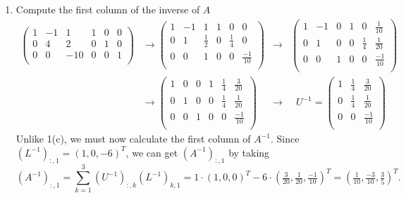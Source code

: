 \documentclass[11pt]{article}
\begin{document}
\begin{enumerate}
\begin{enumerate}
		      \item Compute the first column of the inverse of \(A\)
		            \begin{align*}
			            \left(\begin{array}{rrr|rrr}
					                  1 & -1 & 1   & 1 & 0 & 0 \\
					                  0 & 4  & 2   & 0 & 1 & 0 \\
					                  0 & 0  & -10 & 0 & 0 & 1 \\
				                  \end{array}\right)
			             & \to
			            \left(\begin{array}{rrr|rrr}
					                  1 & -1 & 1       & 1 & 0       & 0             \\
					                  0 & 1  & \frac12 & 0 & \frac14 & 0             \\
					                  0 & 0  & 1       & 0 & 0       & \frac{-1}{10} \\
				                  \end{array}\right)
			             & \to &
			            \left(\begin{array}{rrr|rrr}
					                  1 & -1 & 0 & 1 & 0       & \frac{1}{10}  \\
					                  0 & 1  & 0 & 0 & \frac14 & \frac{1}{20}  \\
					                  0 & 0  & 1 & 0 & 0       & \frac{-1}{10} \\
				                  \end{array}\right) \\
			             & \to
			            \left(\begin{array}{rrr|rrr}
					                  1 & 0 & 0 & 1 & \frac14 & \frac{3}{20}  \\
					                  0 & 1 & 0 & 0 & \frac14 & \frac{1}{20}  \\
					                  0 & 0 & 1 & 0 & 0       & \frac{-1}{10} \\
				                  \end{array}\right)
			             & \to & \;\; U^{-1} =
			            \left(\begin{array}{rrr}
					                  1 & \frac14 & \frac{3}{20}  \\
					                  0 & \frac14 & \frac{1}{20}  \\
					                  0 & 0       & \frac{-1}{10} \\
				                  \end{array}\right)
		            \end{align*}
		            Unlike 1(c), we must now calculate the first column of \(A^{-1}\).  Since \((L^{-1})_{:,1} = (1,0,-6)^T\), we can get \((A^{-1})_{:,1}\) by taking
		            \[(A^{-1})_{:,1} = \sum_{k=1}^3 (U^{-1})_{:,k} (L^{-1})_{k,1} =  1 \cdot (1,0,0)^T - 6 \cdot \left(\tfrac{3}{20}, \tfrac{1}{20}, \tfrac{-1}{10}\right)^T = \left(\tfrac{1}{10}, \tfrac{-3}{10}, \tfrac35\right)^T.\]



\end{enumerate}
\end{enumerate}
\end{document}

